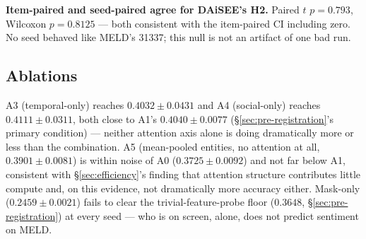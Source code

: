 \textbf{Item-paired and seed-paired agree for DAiSEE's H2.} Paired $t$
$p{=}0.793$, Wilcoxon $p{=}0.8125$ --- both consistent with the item-paired
CI including zero. No seed behaved like MELD's 31337; this null is not an
artifact of one bad run.

\subsection{Ablations}
A3 (temporal-only) reaches $0.4032{\pm}0.0431$ and A4 (social-only) reaches
$0.4111{\pm}0.0311$, both close to A1's $0.4040{\pm}0.0077$
(\S\ref{sec:pre-registration}'s primary condition) --- neither attention axis
alone is doing dramatically more or less than the combination. A5
(mean-pooled entities, no attention at all,
$0.3901{\pm}0.0081$) is within noise of A0
($0.3725{\pm}0.0092$) and not far below A1, consistent with
\S\ref{sec:efficiency}'s finding that attention structure contributes little
compute and, on this evidence, not dramatically more accuracy either.
Mask-only
($0.2459{\pm}0.0021$) fails to clear the trivial-feature-probe floor
($0.3648$, \S\ref{sec:pre-registration}) at every seed --- who is on screen,
alone, does not predict sentiment on MELD.

